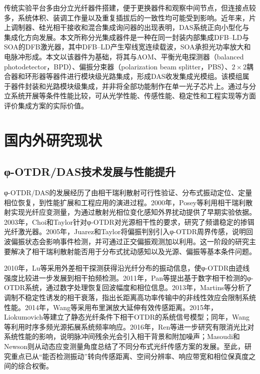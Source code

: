 传统实验平台多由分立光纤器件搭建，便于更换器件和观察中间节点，但连接点较多，系统体积、装调工作量以及重复插拔后的一致性均可能受到影响。近年来，片上调制器、硅光相干接收和混合集成询问器的出现表明，DAS系统正向小型化与集成化方向发展\cite{cheng2023onchip,jin2024integrated,jin2026hybrid}。本文所称分光集成器件是一种在同一封装内部集成DFB--LD与SOA的DFB激光器，其中DFB--LD产生窄线宽连续载波，SOA承担光功率放大和电脉冲形成。本文以该器件为基础，将其与AOM、平衡光电探测器（balanced photodetector，BPD）、偏振分束器（polarization beam splitter，PBS）、$2\times2$耦合器和环形器等器件进行模块级光路集成，形成DAS收发集成光模组。该模组属于器件封装和光路模块级集成，并非将全部功能制作在单一光子芯片上。通过与分立系统开展等条件性能比较，可从光学性能、传感性能、稳定性和工程实现等方面评价集成方案的实际价值。

\section{国内外研究现状}

\subsection{φ-OTDR/DAS技术发展与性能提升}

φ-OTDR/DAS的发展经历了由相干瑞利散射可行性验证、分布式振动定位、定量相位恢复，到性能扩展和工程应用的演进过程。2000年，Posey等利用相干瑞利散射实现光纤应变测量，为通过散射光相位变化感知外界扰动提供了早期实验依据\cite{posey2000strain}。2003年，Choi和Taylor针对φ-OTDR对光源相干性的要求，研究了频谱稳定的掺铒光纤激光器\cite{choi2003stable}。2005年，Juarez和Taylor将偏振判别引入φ-OTDR周界传感，说明回波偏振状态会影响事件检测，并可通过正交偏振观测加以利用\cite{juarez2005polarization}。这一阶段的研究主要解决了相干瑞利散射能否用于分布式扰动感知以及光源、偏振等基本条件问题。

2010年，Lu等采用外差相干探测获得沿光纤分布的振动信息，使φ-OTDR由迹线强度比较进一步发展到相干拍频检测\cite{lu2010distributed}。2011年，Pan等提出基于数字相干检测的φ-OTDR系统，通过数字处理恢复回波幅度和相位信息\cite{pan2011phase}。2013年，Martins等分析了调制不稳定性诱发的相干衰落，指出长距离高功率传输中的非线性效应会限制系统性能\cite{martins2013modulation}。2014年，Wang等采用布里渊放大延伸有效传感距离\cite{wang2014brillouin}。2015年，Liokumovich等建立了静态光纤条件下相干OTDR的系统信号模型\cite{liokumovich2015fundamentals}；同年，Wang等利用时序多频光源拓展系统频率响应\cite{wang2015ultrabroadband}。2016年，Ren等进一步研究有限消光比对系统性能的影响，说明脉冲间残余光会引入相干背景和附加噪声\cite{ren2016extinction}；Masoudi和Newson则从动态应变测量角度总结了不同分布式光纤传感方案的发展\cite{masoudi2016review}。至此，研究重点已从“能否检测振动”转向传感距离、空间分辨率、响应带宽和相位保真度之间的综合权衡。

